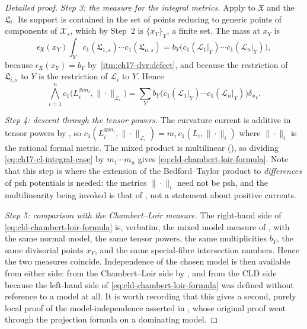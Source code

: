 \begin{proof}[Detailed proof]
\emph{Step 3: the measure for the integral metrics.}  Apply
 to $\mathfrak X$ and the
$\mathfrak L_i$.  Its support is contained in the set of points reducing
to generic points of components of $\mathcal X_s$, which by Step~2 is
$\{x_Y\}_Y$, a finite set.  The mass at $x_Y$ is
\[
 \epsilon_{\mathfrak X}(x_Y)\int_Y c_1(\mathfrak L_{1,s})\cdots
   c_1(\mathfrak L_{n,s})
 =b_Y\bigl(c_1(\mathcal L_1|_Y)\cdots c_1(\mathcal L_n|_Y)\bigr),
\]
because $\epsilon_{\mathfrak X}(x_Y)=b_Y$ by
\,\cref{itm:ch17-dvr:defect}, and because the
restriction of $\mathfrak L_{i,s}$ to $Y$ is the restriction of
$\mathcal L_i$ to $Y$.  Hence
\begin{equation}
\label{eq:ch17-cl-integral-case}
 \bigwedge_{i=1}^nc_1\bigl(L_i^{\otimes m_i},\|\cdot\|_{\mathcal L_i}\bigr)
 =\sum_Yb_Y\bigl(c_1(\mathcal L_1|_Y)\cdots c_1(\mathcal L_n|_Y)\bigr)
  \delta_{x_Y}.
\end{equation}

\emph{Step 4: descent through the tensor powers.}  The curvature current is
additive in tensor powers by , so
$c_1(L_i^{\otimes m_i},\|\cdot\|_{\mathcal L_i})
 =m_i\,c_1(L_i,\|\cdot\|_i)$ where $\|\cdot\|_i$ is the rational formal
metric.  The mixed product is multilinear
(), so dividing
\eqref{eq:ch17-cl-integral-case} by $m_1\cdots m_n$ gives
\eqref{eq:cld-chambert-loir-formula}.  Note that this step is where the
extension of the Bedford--Taylor product to \emph{differences} of psh
potentials is needed: the metrics $\|\cdot\|_i$ need not be psh, and the
multilinearity being invoked is that of , not a
statement about positive currents.

\emph{Step 5: comparison with the Chambert--Loir measure.}  The right-hand
side of \eqref{eq:cld-chambert-loir-formula} is, verbatim, the mixed model
measure of , with the same normal model, the
same tensor powers, the same multiplicities $b_Y$, the same divisorial
points $x_Y$, and the same special-fibre intersection numbers.  Hence the
two measures coincide.  Independence of the chosen model is then available
from either side: from the Chambert--Loir side by
, and from the CLD side because the left-hand
side of \eqref{eq:cld-chambert-loir-formula} was defined without reference
to a model at all.  It is worth recording that this gives a second, purely
local proof of the model-independence asserted in
, whose original proof went through the
projection formula on a dominating model.
\end{proof}

